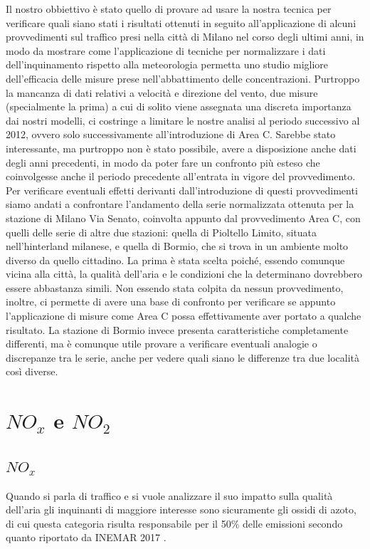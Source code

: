 \documentclass[a4paper]{report}
\begin{document}
Il nostro obbiettivo è stato quello di provare ad usare la nostra tecnica per verificare quali siano stati i risultati ottenuti in seguito all'applicazione di alcuni provvedimenti sul traffico presi nella città di Milano nel corso degli ultimi anni, in modo da mostrare come l'applicazione di tecniche per normalizzare i dati dell'inquinamento rispetto alla meteorologia permetta uno studio migliore dell'efficacia delle misure prese nell'abbattimento delle concentrazioni. Purtroppo la mancanza di dati relativi a velocità e direzione del vento, due misure (specialmente la prima) a cui di solito viene assegnata una discreta importanza dai nostri modelli, ci costringe a limitare le nostre analisi al periodo successivo al 2012, ovvero solo successivamente all'introduzione di Area C. Sarebbe stato interessante, ma purtroppo non è stato possibile, avere a disposizione anche dati degli anni precedenti, in modo da poter fare un confronto più esteso che coinvolgesse anche il periodo precedente all'entrata in vigore del provvedimento.
Per verificare eventuali effetti derivanti dall'introduzione di questi provvedimenti siamo andati a confrontare l'andamento della serie normalizzata ottenuta per la stazione di Milano Via Senato, coinvolta appunto dal provvedimento Area C, con quelli delle serie di altre due stazioni: quella di Pioltello Limito, situata nell'hinterland milanese, e quella di Bormio, che si trova in un ambiente molto diverso da quello cittadino. La prima è stata scelta poiché, essendo comunque vicina alla città, la qualità dell'aria e le condizioni che la determinano dovrebbero essere abbastanza simili. Non essendo stata colpita da nessun provvedimento, inoltre, ci permette di avere una base di confronto per verificare se appunto l'applicazione di misure come Area C possa effettivamente aver portato a qualche risultato. La stazione di Bormio invece presenta caratteristiche completamente differenti, ma è comunque utile provare a verificare eventuali analogie o discrepanze tra le serie, anche per vedere quali siano le differenze tra due località così diverse.

\section{$NO_x$ e $NO_2$}
\subsection{$NO_x$}
Quando si parla di traffico e si vuole analizzare il suo impatto sulla qualità dell'aria gli inquinanti di maggiore interesse sono sicuramente gli ossidi di azoto, di cui questa categoria risulta responsabile per il 50\% delle emissioni secondo quanto riportato da INEMAR 2017 \cite{inemar2017}.
\end{document}
